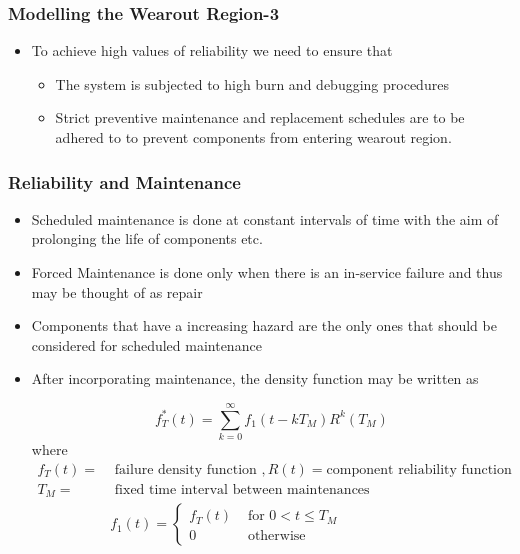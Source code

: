 \documentclass{beamer}  %
\begin{document}
\begin{frame} 
\frametitle{Modelling the Wearout Region-3}

\begin{itemize}
\item To achieve high values of reliability we need to ensure that

\begin{itemize}
\item The system is subjected to high burn and debugging procedures

\item Strict preventive maintenance and replacement schedules are to be adhered to to prevent components from entering wearout region.

\end{itemize}


\end{itemize}


\end{frame}


\begin{frame}
\frametitle{Reliability and Maintenance}

\begin{itemize}
\item Scheduled maintenance is done at constant intervals of time with the aim of prolonging the life of components etc.

\item Forced Maintenance is done only when there is an in-service failure and thus may be thought of as repair

\item Components that have a increasing hazard are the only ones that should be considered for scheduled maintenance

\item After incorporating maintenance, the density function may be written as 

$$f^{*}_T(t)=\sum_{k=0}^{\infty} f_{1}\left(t-k T_{M}\right) R^{k}\left(T_{M}\right)$$
where 
$\begin{aligned} f_{T}(t)=& \text { failure density function },R(t) =\text{component reliability function} \\ T_{M}=& \text { fixed time interval between maintenances } \\ & f_{1}(t)=\left\{\begin{array}{ll}f_{T}(t) & \text { for } 0<t \leq T_{M} \\ 0 & \text { otherwise }\end{array}\right.\end{aligned}$
\end{itemize}


\end{frame}
\end{document}
